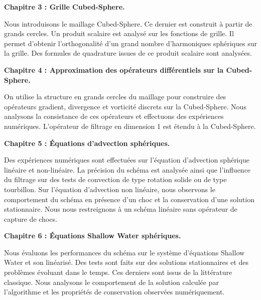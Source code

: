 \vspace{0.7cm}
\textbf{Chapitre 3 : Grille Cubed-Sphere.}

Nous introduisons le maillage Cubed-Sphere. Ce dernier est construit à partir de grands cercles. Un produit scalaire est analysé sur les fonctions de grille. Il permet d'obtenir l'orthogonalité d'un grand nombre d'harmoniques sphériques sur la grille. Des formules de quadrature issues de ce produit scalaire sont analysées.






\vspace{0.7cm}
\textbf{Chapitre 4 : Approximation des opérateurs différentiels sur la Cubed-Sphere.}

On utilise la structure en grands cercles du maillage pour construire des opérateurs gradient, divergence et vorticité discrets sur la Cubed-Sphere. Nous analysons la consistance de ces opérateurs et effectuons des expériences numériques. L'opérateur de filtrage en dimension 1 est étendu à la Cubed-Sphere.







\vspace{0.7cm}
\textbf{Chapitre 5 : Équations d'advection sphériques.}

Des expériences numériques sont effectuées sur l'équation d'advection sphérique linéaire et non-linéaire. La précision du schéma est analysée ainsi que l'influence du filtrage sur des tests de convection de type rotation solide ou de type tourbillon. Sur l'équation d'advection non linéaire, nous observons le comportement du schéma en présence d'un choc et la conservation d'une solution stationnaire. Nous nous restreignons à un schéma linéaire sans opérateur de capture de chocs.







\vspace{0.7cm}
\textbf{Chapitre 6 : Équations Shallow Water sphériques.}

Nous évaluons les performances du schéma sur le système d'équations Shallow Water et son linéarisé. Des tests sont faits sur des solutions stationnaires et des problèmes évoluant dans le temps. Ces derniers sont issus de la littérature classique. Nous analysons le comportement de la solution calculée par l'algorithme et les propriétés de conservation observées numériquement.

